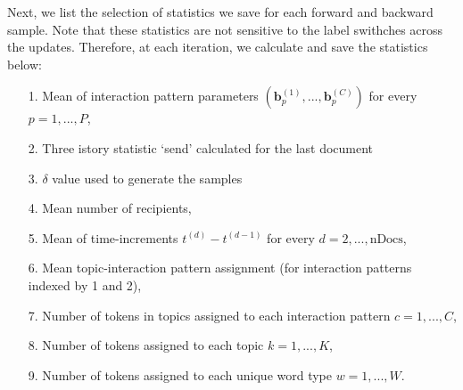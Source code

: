 \documentclass[a4paper]{article}
\begin{document}
   Next, we list the selection of statistics we save for each forward and backward sample. Note that these statistics are not sensitive to the label swithches across the updates. Therefore, at each iteration, we calculate and save the statistics below:
      \begin{itemize}
      	\item[1.] Mean of interaction pattern parameters $(\boldsymbol{b}_p^{(1)},...,\boldsymbol{b}_p^{(C)})$ for every $p = 1,...,P$,
      	      	\item[2.] Three istory statistic `send' calculated for the last document
      	      	\item[3.] $\delta$ value used to generate the samples
      	      	\item[4.] Mean number of recipients,
      	\item[5.] Mean of time-increments $t^{(d)}-t^{(d-1)}$ for every $d=2,...,\mbox{nDocs}$,
      	\item[6.] Mean topic-interaction pattern assignment (for interaction patterns indexed by 1 and 2), 
      	\item[7.] Number of tokens in topics assigned to each interaction pattern $c=1,...,C$,
      	\item[8.] Number of tokens assigned to each topic $k=1,...,K$, 
       \item[9.] Number of tokens assigned to each unique word type $w=1,...,W$.
      	      \end{itemize}
\end{document}
